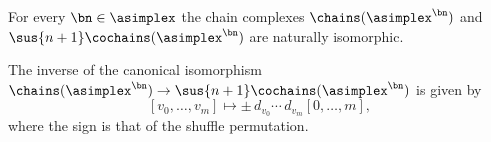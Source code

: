 \begin{corollary}
	For every $\bn \in \asimplex$ the chain complexes $\chains(\asimplex^{\bn})$ and $\sus{n+1}\cochains(\asimplex^{\bn})$ are naturally isomorphic.
\end{corollary}

The inverse of the canonical isomorphism $\chains(\asimplex^{\bn}) \to \sus{n+1}\cochains(\asimplex^{\bn})$ is given by
\[
[v_0, \dots, v_m] \mapsto \pm \, d_{v_0} \dotsm \, d_{v_m} [0, \dots, m],
\]
where the sign is that of the shuffle permutation.


